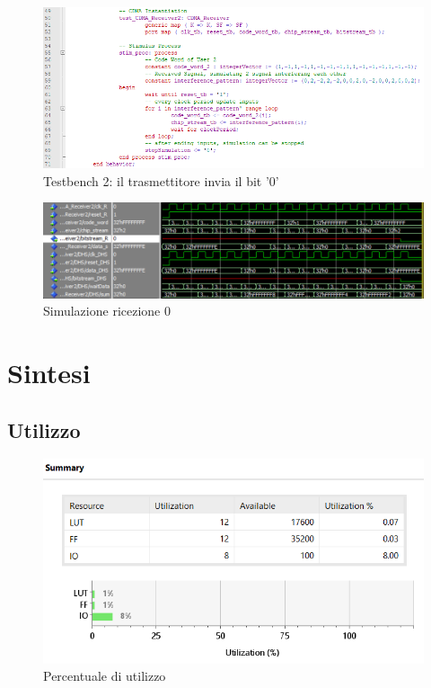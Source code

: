 \documentclass[a4paper,12pt]{article}
\begin{document}
    \begin{figure}[H]
      \centering
      \includegraphics[width=\textwidth]{img/TB2.png}
      \caption{Testbench 2: il trasmettitore invia il bit '0'}
      \label{fig:vhdl:tb2}
    \end{figure}

    \begin{figure}[H]
      \centering
      \includegraphics[width=\textwidth]{img/Wave2.png}
      \caption{Simulazione ricezione 0}
      \label{fig:vhdl:wave2}
    \end{figure}
\section{Sintesi} 
  \subsection{Utilizzo}
    \begin{figure}[H]
      \centering
      \includegraphics[width=\textwidth]{img/Utilizzo.png}
      \caption{Percentuale di utilizzo}
      \label{fig:utilizzo}
    \end{figure}
\end{document}
